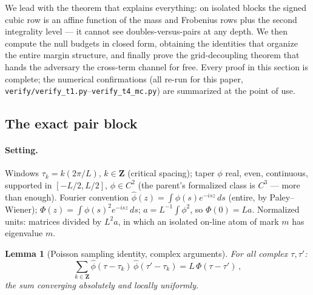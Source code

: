 \documentclass[11pt]{article}
\theoremstyle{plain}
\newtheorem{lemma}[theorem]{Lemma}
\theoremstyle{definition}
\theoremstyle{remark}
\newcommand{\Z}{\mathbf{Z}}
\newcommand{\ph}{\widehat{\phi}}
\begin{document}
We lead with the theorem that explains everything: on isolated blocks the signed
cubic row is an affine function of the mass and Frobenius rows plus the second
integrality level --- it cannot see doubles-versus-pairs at any depth. We then
compute the null budgets in closed form, obtaining the identities that organize
the entire margin structure, and finally prove the grid-decoupling theorem that
hands the adversary the cross-term channel for free. Every proof in this section
is complete; the numerical confirmations (all re-run for this paper,
\texttt{verify/verify\_t1.py}--\texttt{verify\_t4\_mc.py}) are summarized at the
point of use.

\subsection{The exact pair block}
\label{sec:pairblock}

\paragraph{Setting.}
Windows $\tau_k = k(2\pi/L)$, $k \in \Z$ (critical spacing); taper $\phi$ real,
even, continuous, supported in $[-L/2, L/2]$, $\phi \in C^2$ (the parent's
formalized class is $C^3$ --- more than enough). Fourier convention
$\ph(z) = \int \phi(s) e^{-i s z}\, ds$ (entire, by Paley--Wiener);
$\Phi(z) = \int \phi(s)^2 e^{-i s z}\, ds$; $a = L^{-1} \int \phi^2$, so
$\Phi(0) = L a$. Normalized units: matrices divided by $L^2 a$, in which an
isolated on-line atom of mark $m$ has eigenvalue $m$.

\begin{lemma}[Poisson sampling identity, complex arguments]
\label{lem:poisson}
For all complex $\tau, \tau'$:
\[
  \sum_{k \in \Z} \ph(\tau - \tau_k)\, \ph(\tau' - \tau_k)
  = L\, \Phi(\tau - \tau')\,,
\]
the sum converging absolutely and locally uniformly.
\end{lemma}
\end{document}
